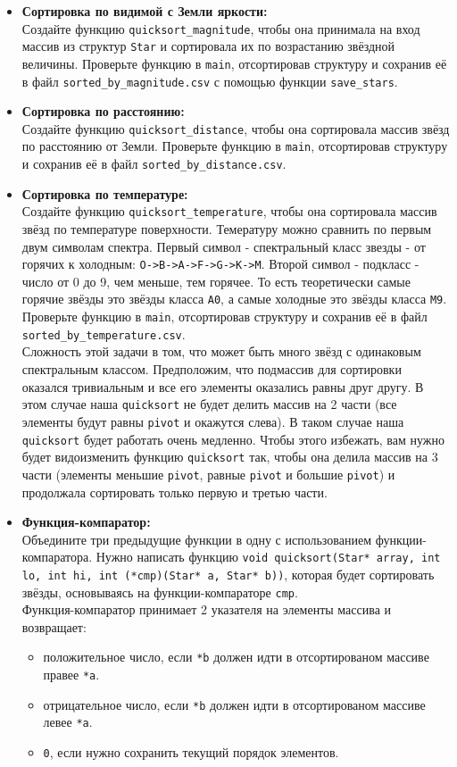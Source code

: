 \documentclass{article}
\begin{document}
\begin{itemize}
\item \textbf{Сортировка по видимой с Земли яркости:}\\ Создайте функцию \texttt{quicksort\_magnitude}, чтобы она принимала на вход массив из структур \texttt{Star} и сортировала их по возрастанию звёздной величины. Проверьте функцию в \texttt{main}, отсортировав структуру и сохранив её в файл \texttt{sorted\_by\_magnitude.csv} с помощью функции \texttt{save\_stars}.

\item \textbf{Сортировка по расстоянию:}\\ Создайте функцию \texttt{quicksort\_distance}, чтобы она сортировала массив звёзд по расстоянию от Земли. Проверьте функцию в \texttt{main}, отсортировав структуру и сохранив её в файл \texttt{sorted\_by\_distance.csv}.

\item \textbf{Сортировка по температуре:}\\ Создайте функцию \texttt{quicksort\_temperature}, чтобы она сортировала массив звёзд по температуре поверхности. Темературу можно сравнить по первым двум символам спектра. Первый символ - спектральный класс звезды - от горячих к холодным: \texttt{O->B->A->F->G->K->M}. Второй символ - подкласс - число от 0 до 9, чем меньше, тем горячее. То есть теоретически самые горячие звёзды это звёзды класса \texttt{A0}, а самые холодные это звёзды класса \texttt{M9}. Проверьте функцию в \texttt{main}, отсортировав структуру и сохранив её в файл \texttt{sorted\_by\_temperature.csv}.\\
Сложность этой задачи в том, что может быть много звёзд с одинаковым спектральным классом. Предположим, что подмассив для сортировки оказался тривиальным и все его элементы оказались равны друг другу. В этом случае наша \texttt{quicksort} не будет делить массив на 2 части (все элементы будут равны \texttt{pivot} и окажутся слева). В таком случае наша \texttt{quicksort} будет работать очень медленно. Чтобы этого избежать, вам нужно будет видоизменить функцию \texttt{quicksort} так, чтобы она делила массив на 3 части (элементы меньшие \texttt{pivot}, равные \texttt{pivot} и большие \texttt{pivot}) и продолжала сортировать только первую и третью части.

\item \textbf{Функция-компаратор:}\\ Объедините три предыдущие функции в одну с использованием функции-компаратора. Нужно написать функцию \texttt{void quicksort(Star* array, int lo, int hi, int (*cmp)(Star* a, Star* b))}, которая будет сортировать звёзды, основываясь на функции-компараторе \texttt{cmp}. \\
Функция-компаратор принимает 2 указателя на элементы массива и возвращает:
\begin{itemize}
\item положительное число, если \texttt{*b} должен идти в отсортированом массиве правее \texttt{*a}.
\item отрицательное число, если \texttt{*b} должен идти в отсортированом массиве левее \texttt{*a}.
\item \texttt{0}, если нужно сохранить текущий порядок элементов.
\end{itemize} 



\end{itemize}
\end{document}
